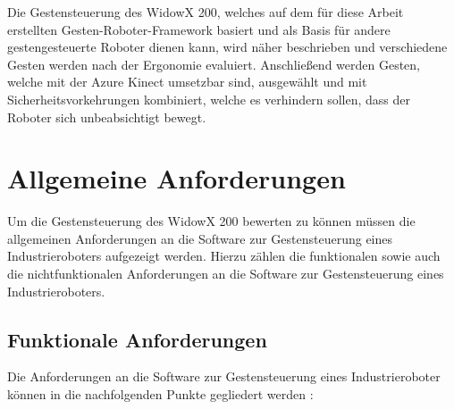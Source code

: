 Die Gestensteuerung des WidowX 200, welches auf dem für diese Arbeit erstellten Gesten-Roboter-Framework basiert und als Basis für andere gestengesteuerte Roboter dienen kann, wird näher beschrieben und verschiedene Gesten werden nach der Ergonomie evaluiert. Anschließend werden Gesten, welche mit der Azure Kinect umsetzbar sind, ausgewählt und mit Sicherheitsvorkehrungen kombiniert, welche es verhindern sollen, dass der Roboter sich unbeabsichtigt bewegt.


\section{Allgemeine Anforderungen}
Um die Gestensteuerung des WidowX 200 bewerten zu können müssen die allgemeinen Anforderungen an die Software zur Gestensteuerung eines Industrieroboters aufgezeigt werden. Hierzu zählen die funktionalen sowie auch die nichtfunktionalen Anforderungen an die Software zur Gestensteuerung eines Industrieroboters.

\subsection{Funktionale Anforderungen}
Die Anforderungen an die Software zur Gestensteuerung eines Industrieroboter können in die nachfolgenden Punkte gegliedert werden \cite{kircher_it_2006} \cite[2\psq]{brauer_gestenerkennung_nodate}:\\

